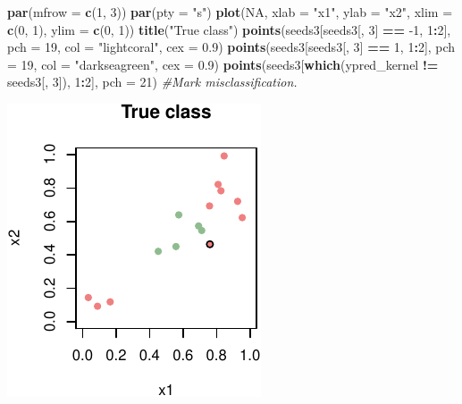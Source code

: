 \documentclass[]{article}
\newenvironment{Shaded}{\begin{snugshade}}{\end{snugshade}}
\newcommand{\CommentTok}[1]{\textcolor[rgb]{0.56,0.35,0.01}{\textit{#1}}}
\newcommand{\DataTypeTok}[1]{\textcolor[rgb]{0.13,0.29,0.53}{#1}}
\newcommand{\DecValTok}[1]{\textcolor[rgb]{0.00,0.00,0.81}{#1}}
\newcommand{\FloatTok}[1]{\textcolor[rgb]{0.00,0.00,0.81}{#1}}
\newcommand{\KeywordTok}[1]{\textcolor[rgb]{0.13,0.29,0.53}{\textbf{#1}}}
\newcommand{\NormalTok}[1]{#1}
\newcommand{\OperatorTok}[1]{\textcolor[rgb]{0.81,0.36,0.00}{\textbf{#1}}}
\newcommand{\OtherTok}[1]{\textcolor[rgb]{0.56,0.35,0.01}{#1}}
\newcommand{\StringTok}[1]{\textcolor[rgb]{0.31,0.60,0.02}{#1}}
\begin{document}
\begin{Shaded}
\begin{Highlighting}[]
\KeywordTok{par}\NormalTok{(}\DataTypeTok{mfrow =} \KeywordTok{c}\NormalTok{(}\DecValTok{1}\NormalTok{, }\DecValTok{3}\NormalTok{))}
\KeywordTok{par}\NormalTok{(}\DataTypeTok{pty =} \StringTok{"s"}\NormalTok{)}
\KeywordTok{plot}\NormalTok{(}\OtherTok{NA}\NormalTok{, }\DataTypeTok{xlab =} \StringTok{"x1"}\NormalTok{, }\DataTypeTok{ylab =} \StringTok{"x2"}\NormalTok{, }\DataTypeTok{xlim =} \KeywordTok{c}\NormalTok{(}\DecValTok{0}\NormalTok{, }\DecValTok{1}\NormalTok{), }\DataTypeTok{ylim =} \KeywordTok{c}\NormalTok{(}\DecValTok{0}\NormalTok{, }\DecValTok{1}\NormalTok{))}
\KeywordTok{title}\NormalTok{(}\StringTok{"True class"}\NormalTok{)}
\KeywordTok{points}\NormalTok{(seeds3[seeds3[, }\DecValTok{3}\NormalTok{] }\OperatorTok{==}\StringTok{ }\DecValTok{-1}\NormalTok{, }\DecValTok{1}\OperatorTok{:}\DecValTok{2}\NormalTok{], }\DataTypeTok{pch =} \DecValTok{19}\NormalTok{, }\DataTypeTok{col =} \StringTok{"lightcoral"}\NormalTok{, }
    \DataTypeTok{cex =} \FloatTok{0.9}\NormalTok{)}
\KeywordTok{points}\NormalTok{(seeds3[seeds3[, }\DecValTok{3}\NormalTok{] }\OperatorTok{==}\StringTok{ }\DecValTok{1}\NormalTok{, }\DecValTok{1}\OperatorTok{:}\DecValTok{2}\NormalTok{], }\DataTypeTok{pch =} \DecValTok{19}\NormalTok{, }\DataTypeTok{col =} \StringTok{"darkseagreen"}\NormalTok{, }
    \DataTypeTok{cex =} \FloatTok{0.9}\NormalTok{)}
\KeywordTok{points}\NormalTok{(seeds3[}\KeywordTok{which}\NormalTok{(ypred_kernel }\OperatorTok{!=}\StringTok{ }\NormalTok{seeds3[, }\DecValTok{3}\NormalTok{]), }\DecValTok{1}\OperatorTok{:}\DecValTok{2}\NormalTok{], }\DataTypeTok{pch =} \DecValTok{21}\NormalTok{)  }\CommentTok{#Mark misclassification.}
\end{Highlighting}
\end{Shaded}

\includegraphics{9SVM_files/figure-latex/unnamed-chunk-26-1.pdf}
\end{document}
